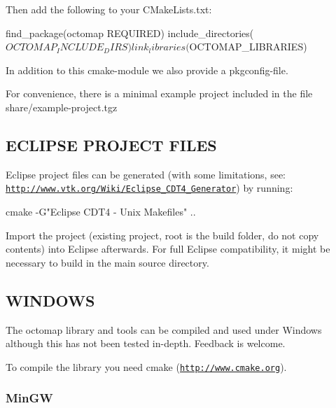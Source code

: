 Then add the following to your C\+Make\+Lists.\+txt\+: \begin{DoxyVerb}find_package(octomap REQUIRED)
include_directories(${OCTOMAP_INCLUDE_DIRS})
link_libraries(${OCTOMAP_LIBRARIES})
\end{DoxyVerb}


In addition to this cmake-\/module we also provide a pkgconfig-\/file.

For convenience, there is a minimal example project included in the file share/example-\/project.\+tgz

\subsection*{E\+C\+L\+I\+P\+S\+E P\+R\+O\+J\+E\+C\+T F\+I\+L\+E\+S }

Eclipse project files can be generated (with some limitations, see\+: \href{http://www.vtk.org/Wiki/Eclipse_CDT4_Generator}{\tt http\+://www.\+vtk.\+org/\+Wiki/\+Eclipse\+\_\+\+C\+D\+T4\+\_\+\+Generator}) by running\+: \begin{DoxyVerb}cmake -G"Eclipse CDT4 - Unix Makefiles" ..
\end{DoxyVerb}


Import the project (existing project, root is the build folder, do not copy contents) into Eclipse afterwards. For full Eclipse compatibility, it might be necessary to build in the main source directory.

\subsection*{W\+I\+N\+D\+O\+W\+S }

The octomap library and tools can be compiled and used under Windows although this has not been tested in-\/depth. Feedback is welcome.

To compile the library you need cmake (\href{http://www.cmake.org}{\tt http\+://www.\+cmake.\+org}).

\subsubsection*{Min\+G\+W}



